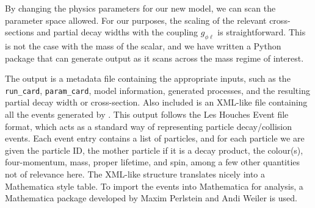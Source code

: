 By changing the physics parameters for our new model, we can scan the parameter space allowed.
For our purposes, the scaling of the relevant cross-sections and partial decay widths with the coupling $g_{\phi\ell}$ is straightforward.
This is not the case with the mass of the scalar, and we have written a Python package that can generate \madgraph output as it scans across the mass regime of interest.

The output is a metadata file containing the appropriate inputs, such as the \texttt{run\_card}, \texttt{param\_card}, model information, generated processes, and the resulting partial decay width or cross-section.
Also included is an XML-like file containing all the events generated by \madgraph.
This output follows the Les Houches Event file format\cite{Alwall:2006yp}, which acts as a standard way of representing particle decay/collision events.
Each event entry contains a list of particles, and for each particle we are given the particle ID, the mother particle if it is a decay product, the colour(s), four-momentum, mass, proper lifetime, and spin, among a few other quantities not of relevance here.
The XML-like structure translates nicely into a Mathematica style table.
To import the events into Mathematica for analysis, a Mathematica package developed by Maxim Perlstein and Andi Weiler is used.
